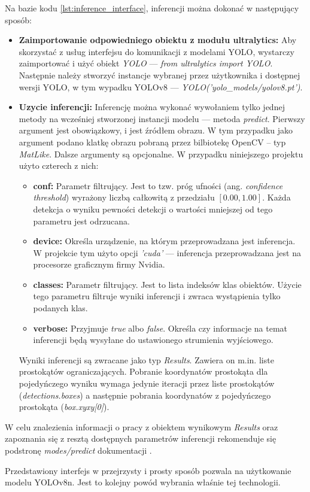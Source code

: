 Na bazie kodu \ref{lst:inference_interface}, inferencji można dokonać w następujący sposób:
\begin{itemize}
    \item \textbf{Zaimportowanie odpowiedniego obiektu z modułu ultralytics:} Aby skorzystać z usług interfejsu do komunikacji z modelami YOLO, wystarczy zaimportować i użyć obiekt \emph{YOLO} --- \emph{from ultralytics import YOLO}. Następnie należy stworzyć instancje wybranej przez użytkownika i dostępnej wersji YOLO, w tym wypadku YOLOv8 --- \emph{YOLO('yolo\_models/yolov8.pt')}.

    \item \textbf{Uzycie inferencji:} Inferencję można wykonać wywołaniem tylko jednej metody na wcześniej stworzonej instancji modelu --- metoda \emph{predict}. Pierwszy argument jest obowiązkowy, i jest źródłem obrazu. W tym przypadku jako argument podano klatkę obrazu pobraną przez bilbiotekę OpenCV -- typ \emph{MatLike}. Dalsze argumenty są opcjonalne. W przypadku niniejszego projektu użyto czterech z nich:
    \begin{itemize}
        \item \textbf{conf:} Parametr filtrujący. Jest to tzw. próg ufności (ang. \emph{confidence threshold}) wyrażony liczbą całkowitą z przedziału $[0.00, 1.00]$. Każda detekcja o wyniku pewności detekcji o wartości mniejszej od tego parametru jest odrzucana. 
        \item \textbf{device:} Określa urządzenie, na którym przeprowadzana jest inferencja. W projekcie tym użyto opcji \emph{'cuda'} --- inferencja przeprowadzana jest na procesorze graficznym firmy Nvidia.
        \item \textbf{classes:} Parametr filtrujący. Jest to lista indeksów klas obiektów. Użycie tego parametru filtruje wyniki inferencji i zwraca wystąpienia tylko podanych klas. 
        \item \textbf{verbose:} Przyjmuje \emph{true} albo \emph{false}. Określa czy informacje na temat inferencji będą wysyłane do ustawionego strumienia wyjściowego.
    \end{itemize}
    Wyniki inferencji są zwracane jako typ \emph{Results}. Zawiera on m.in. liste prostokątów ograniczających. Pobranie koordynatów prostokąta dla pojedyńczego wyniku wymaga jedynie iteracji przez liste prostokątów (\emph{detections.boxes}) a następnie pobrania koordynatów z pojedyńczego prostokąta (\emph{box.xyxy[0]}).
\end{itemize}

W celu znalezienia informacji o pracy z obiektem wynikowym \emph{Results} oraz zapoznania się z resztą dostępnych parametrów inferencji rekomenduje się podstronę \emph{modes/predict} dokumentacji \cite{yolo_docs}.

Przedstawiony interfejs w przejrzysty i prosty sposób pozwala na użytkowanie modelu YOLOv8n. Jest to kolejny powód wybrania właśnie tej technologii.